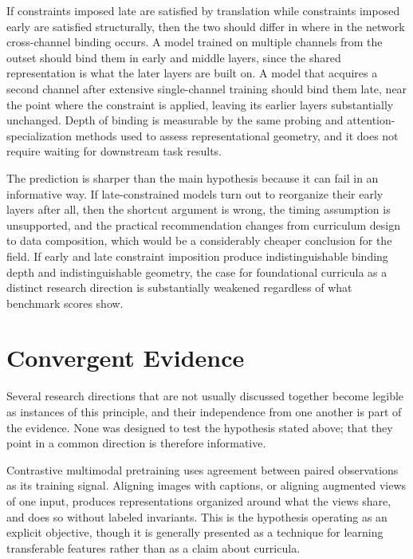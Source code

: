 \documentclass[11pt]{article}
\begin{document}
If constraints imposed late are satisfied by translation while constraints imposed early are satisfied structurally, then the two should differ in where in the network cross-channel binding occurs. A model trained on multiple channels from the outset should bind them in early and middle layers, since the shared representation is what the later layers are built on. A model that acquires a second channel after extensive single-channel training should bind them late, near the point where the constraint is applied, leaving its earlier layers substantially unchanged. Depth of binding is measurable by the same probing and attention-specialization methods used to assess representational geometry, and it does not require waiting for downstream task results.

The prediction is sharper than the main hypothesis because it can fail in an informative way. If late-constrained models turn out to reorganize their early layers after all, then the shortcut argument is wrong, the timing assumption is unsupported, and the practical recommendation changes from curriculum design to data composition, which would be a considerably cheaper conclusion for the field. If early and late constraint imposition produce indistinguishable binding depth and indistinguishable geometry, the case for foundational curricula as a distinct research direction is substantially weakened regardless of what benchmark scores show.


\section{Convergent Evidence}
\label{sec:convergent}

Several research directions that are not usually discussed together become legible as instances of this principle, and their independence from one another is part of the evidence. None was designed to test the hypothesis stated above; that they point in a common direction is therefore informative.

Contrastive multimodal pretraining uses agreement between paired observations as its training signal. Aligning images with captions, or aligning augmented views of one input, produces representations organized around what the views share, and does so without labeled invariants. This is the hypothesis operating as an explicit objective, though it is generally presented as a technique for learning transferable features rather than as a claim about curricula.
\end{document}
